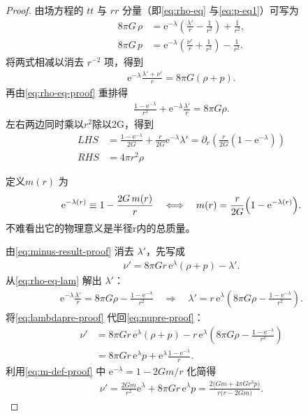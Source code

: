 \begin{proof}
由场方程的 $tt$ 与 $rr$ 分量（即\eqref{eq:rho-eq} 与\eqref{eq:p-eq1}）可写为
\begin{align}
8\pi G\,\rho&= \mathrm{e}^{-\lambda}\!\left(\frac{\lambda'}{r}-\frac{1}{r^{2}}\right)+\frac{1}{r^{2}},\label{eq:rho-eq-proof}\\
8\pi G\,p&=\mathrm{e}^{-\lambda}\!\left(\frac{\nu'}{r}+\frac{1}{r^{2}}\right)-\frac{1}{r^{2}}.\label{eq:p-eq1-proof}
\end{align}
将两式相减以消去 $r^{-2}$ 项，得到
\begin{align}
\mathrm{e}^{-\lambda}\frac{\lambda'+\nu'}{r}=8\pi G(\rho+p).\label{eq:minus-result-proof}
\end{align}
再由\eqref{eq:rho-eq-proof} 重排得
\begin{align}
\frac{1-\mathrm{e}^{-\lambda}}{r^{2}}+\mathrm{e}^{-\lambda}\frac{\lambda'}{r}=8\pi G\rho.\label{eq:rho-eq-lam}
\end{align}
左右两边同时乘以$r^2$除以2G，得到
\begin{align}
    LHS &= \frac{1-\mathrm{e}^{-\lambda}}{2G} + \frac{r}{2G} \mathrm{e}^{-\lambda} \lambda' = \partial_r \left( \frac{r}{2G} (1 - \mathrm{e}^{-\lambda}) \right ) \\
    RHS &= 4 \pi r^2 \rho
\end{align}
\begin{definition}[包围质量函数]
定义$m(r)$ 为
\begin{align}
\mathrm{e}^{-\lambda(r)}\equiv 1-\frac{2G\,m(r)}{r}
\quad\Longleftrightarrow\quad
m(r)=\frac{r}{2G}\Bigl(1-\mathrm{e}^{-\lambda(r)}\Bigr).\label{eq:m-def-proof}
\end{align}
不难看出它的物理意义是半径r内的总质量。
\end{definition}

由\eqref{eq:minus-result-proof} 消去 $\lambda'$，先写成
\begin{align}
\nu'=8\pi G r\,\mathrm{e}^{\lambda}(\rho+p)-\lambda'.\label{eq:nupre-proof}
\end{align}
从\eqref{eq:rho-eq-lam} 解出 $\lambda'$：
\begin{align}
\mathrm{e}^{-\lambda}\frac{\lambda'}{r}
=8\pi G\rho-\frac{1-\mathrm{e}^{-\lambda}}{r^{2}}
\quad\Rightarrow\quad
\lambda'
=r\,\mathrm{e}^{\lambda}\left(8\pi G\rho-\frac{1-\mathrm{e}^{-\lambda}}{r^{2}}\right).\label{eq:lambdapre-proof}
\end{align}
将\eqref{eq:lambdapre-proof} 代回\eqref{eq:nupre-proof}：
\begin{align}
\nu'
&=8\pi G r\,\mathrm{e}^{\lambda}(\rho+p)
-r\,\mathrm{e}^{\lambda}\left(8\pi G\rho-\frac{1-\mathrm{e}^{-\lambda}}{r^{2}}\right)\nonumber\\
&=8\pi G r\,\mathrm{e}^{\lambda}p+\mathrm{e}^{\lambda}\frac{1-\mathrm{e}^{-\lambda}}{r}.\label{eq:nufinal1-proof}
\end{align}
利用\eqref{eq:m-def-proof} 中 $\mathrm{e}^{-\lambda}=1-2Gm/r$ 化简得
\begin{align}
\nu'
=\frac{2Gm}{r^{2}}\mathrm{e}^{\lambda}+8\pi G r\,\mathrm{e}^{\lambda}p
=\frac{2\bigl(Gm+4\pi G r^{3}p\bigr)}{r\bigl(r-2Gm\bigr)}.\label{eq:nuderiv-proof}
\end{align}


\end{proof}

